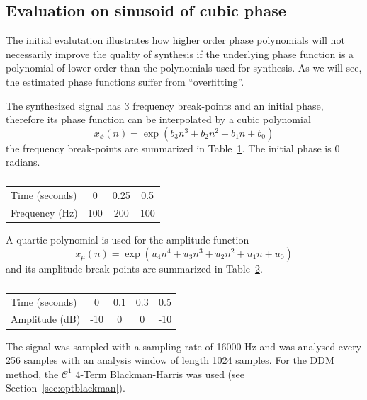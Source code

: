 \subsection{Evaluation on sinusoid of cubic phase \label{sec:evalcubicphase}}

The initial evalutation illustrates how higher order phase polynomials will not
necessarily improve the quality of synthesis if the underlying phase function is
a polynomial of lower order than the polynomials used for synthesis. As we will
see, the estimated phase functions suffer from ``overfitting''.

The synthesized signal has 3 frequency break-points and an initial phase,
therefore its phase function can be interpolated by a cubic polynomial
\[
    x_{\phi}(n) = \exp \left(b_3 n^{3} + b_2 n^{2} + b_1 n + b_0 \right)
\]
the frequency break-points are summarized in Table~\ref{tab:cubicsinphparams}. The
initial phase is $0$ radians.

\begin{table}
    \caption{\label{tab:cubicsinphparams}}
    \begin{center}
        \begin{tabular}{l|c c c}
            Time (seconds) & 0 & 0.25 & 0.5 \\
            Frequency (Hz) & 100 & 200 & 100
        \end{tabular}
    \end{center}
\end{table}

A quartic polynomial is used for the amplitude function
\[
    x_{\mu}(n) = \exp \left(u_4 n^{4} + u_3 n^{3} + u_2 n^{2} + u_1 n + u_0 \right)
\]
and its amplitude break-points are summarized in
Table~\ref{tab:quarticsinampparams}.

\begin{table}
    \caption{\label{tab:quarticsinampparams}}
    \begin{center}
        \begin{tabular}{l|c c c c}
            Time (seconds) & 0 & 0.1 & 0.3 & 0.5 \\
            Amplitude (dB) & -10 & 0 & 0 & -10
        \end{tabular}
    \end{center}
\end{table}

The signal was sampled with a sampling rate of 16000 Hz and was analysed every
256 samples with an analysis window of length 1024 samples. For the DDM method, the
$\mathcal{C}^{1}$ 4-Term Blackman-Harris was used (see
Section~\ref{sec:optblackman}).

